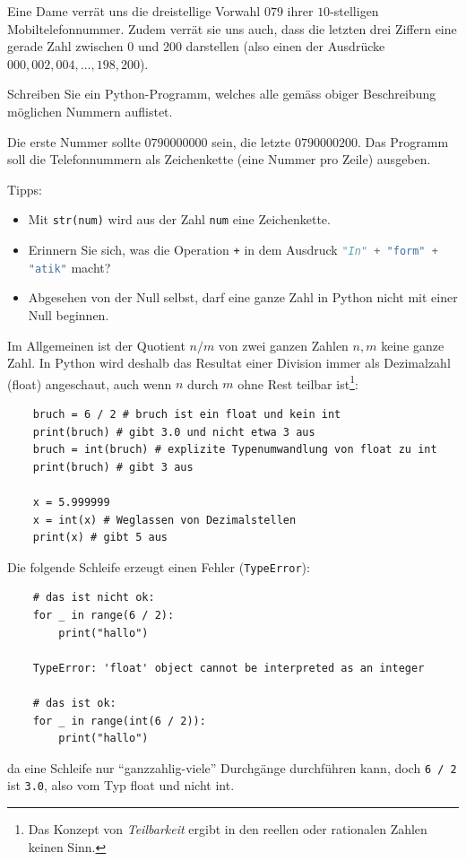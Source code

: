 \begin{myexercise}\label{ex:str}
	Eine Dame verrät uns die dreistellige Vorwahl $079$ ihrer $10$-stelligen Mobiltelefonnummer. Zudem verrät sie uns auch, dass die letzten drei Ziffern eine gerade Zahl zwischen 0 und 200 darstellen (also einen der Ausdrücke $000, 002, 004, \ldots, 198, 200$).

	Schreiben Sie ein Python-Programm, welches alle gemäss obiger Beschreibung möglichen Nummern auflistet.

	Die erste Nummer sollte $0790000000$ sein, die letzte $0790000200$.
	Das Programm soll die Telefonnummern als Zeichenkette (eine Nummer pro Zeile) ausgeben.

	Tipps:
	\begin{itemize}
		\item Mit \lstinline|str(num)|
		      wird aus der Zahl \lstinline|num| eine Zeichenkette.
		\item Erinnern Sie sich, was die Operation \lstinline|+| in dem Ausdruck \lstinline[language=Python,basicstyle=\ttfamily\normalsize]!"In" + "form" + "atik"! macht?
		\item Abgesehen von der Null selbst, darf eine ganze Zahl in Python nicht mit einer Null beginnen.
	\end{itemize}
	\begin{myanswer}
		
	\end{myanswer}
\end{myexercise}

\begin{myattention}\label{myattention:float_not_int}
	Im Allgemeinen ist der Quotient $n / m$ von zwei ganzen Zahlen $n, m$ keine ganze Zahl. In Python wird deshalb das Resultat einer Division immer als Dezimalzahl (float) angeschaut, auch wenn $n$ durch $m$ ohne Rest teilbar ist\footnote{Das Konzept von \emph{Teilbarkeit} ergibt in den reellen oder rationalen Zahlen keinen Sinn.}:
	\begin{lstlisting}
	bruch = 6 / 2 # bruch ist ein float und kein int
	print(bruch) # gibt 3.0 und nicht etwa 3 aus
	bruch = int(bruch) # explizite Typenumwandlung von float zu int
	print(bruch) # gibt 3 aus

	x = 5.999999
	x = int(x) # Weglassen von Dezimalstellen
	print(x) # gibt 5 aus
	\end{lstlisting}
	Die folgende Schleife erzeugt einen Fehler (\texttt{TypeError}):
	\begin{lstlisting}
	# das ist nicht ok:
	for _ in range(6 / 2):
		print("hallo")

	TypeError: 'float' object cannot be interpreted as an integer

	# das ist ok:
	for _ in range(int(6 / 2)):
		print("hallo")
	\end{lstlisting}
	da eine Schleife nur \enquote{ganzzahlig-viele} Durchgänge durchführen kann, doch \texttt{6 / 2} ist \texttt{3.0}, also vom Typ float und nicht int.
\end{myattention}


